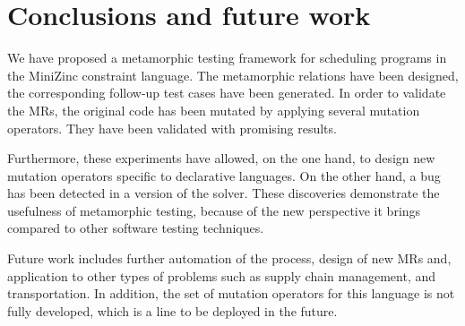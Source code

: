 
\section{Conclusions and  future work}\label{sec6}


We have proposed a metamorphic testing framework for scheduling programs in the 
MiniZinc constraint language. The metamorphic relations have been designed, 
the corresponding follow-up test cases have been generated. 
In order to validate the MRs, the original code has been mutated by 
applying several mutation operators. They have been validated with promising results. 

Furthermore, these experiments have allowed, on the one hand, 
to design new mutation operators specific to declarative languages. 
On the other hand, a bug has been detected in a version of the solver. 
These discoveries demonstrate the usefulness of metamorphic testing,
because of the new perspective it brings compared to other software
testing techniques.




Future work includes further automation of the process, design of new MRs
and, application to other types of problems such as supply chain management, and transportation.
In addition, the set of mutation operators for
this language is not fully developed, which is a line
to be deployed in the future.

